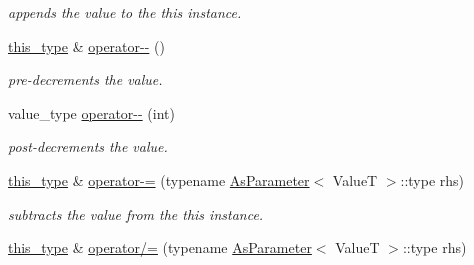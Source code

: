 \begin{DoxyCompactItemize}
\begin{DoxyCompactList}\small\item\em appends the value to the this instance. \end{DoxyCompactList}\item 
\hypertarget{classhryky_1_1atomic_1_1_accessor_a7152a88c74e6e380c901a16f5e16d1b1}{\hyperlink{classhryky_1_1atomic_1_1_accessor_a4957c9dc8163f5fb426f5eb8de5fcd12}{this\-\_\-type} \& \hyperlink{classhryky_1_1atomic_1_1_accessor_a7152a88c74e6e380c901a16f5e16d1b1}{operator-\/-\/} ()}\label{classhryky_1_1atomic_1_1_accessor_a7152a88c74e6e380c901a16f5e16d1b1}

\begin{DoxyCompactList}\small\item\em pre-\/decrements the value. \end{DoxyCompactList}\item 
\hypertarget{classhryky_1_1atomic_1_1_accessor_aace3ec6d3c7a1a5ef95fa0c3780b1f26}{value\-\_\-type \hyperlink{classhryky_1_1atomic_1_1_accessor_aace3ec6d3c7a1a5ef95fa0c3780b1f26}{operator-\/-\/} (int)}\label{classhryky_1_1atomic_1_1_accessor_aace3ec6d3c7a1a5ef95fa0c3780b1f26}

\begin{DoxyCompactList}\small\item\em post-\/decrements the value. \end{DoxyCompactList}\item 
\hypertarget{classhryky_1_1atomic_1_1_accessor_a277dbb78fb920fae22335e5b89cd4e4f}{\hyperlink{classhryky_1_1atomic_1_1_accessor_a4957c9dc8163f5fb426f5eb8de5fcd12}{this\-\_\-type} \& \hyperlink{classhryky_1_1atomic_1_1_accessor_a277dbb78fb920fae22335e5b89cd4e4f}{operator-\/=} (typename \hyperlink{classhryky_1_1_as_parameter}{As\-Parameter}$<$ Value\-T $>$\-::type rhs)}\label{classhryky_1_1atomic_1_1_accessor_a277dbb78fb920fae22335e5b89cd4e4f}

\begin{DoxyCompactList}\small\item\em subtracts the value from the this instance. \end{DoxyCompactList}\item 
\hypertarget{classhryky_1_1atomic_1_1_accessor_a7bf3c085303cd2fb95a53fbed4c11ce8}{\hyperlink{classhryky_1_1atomic_1_1_accessor_a4957c9dc8163f5fb426f5eb8de5fcd12}{this\-\_\-type} \& \hyperlink{classhryky_1_1atomic_1_1_accessor_a7bf3c085303cd2fb95a53fbed4c11ce8}{operator/=} (typename \hyperlink{classhryky_1_1_as_parameter}{As\-Parameter}$<$ Value\-T $>$\-::type rhs)}\label{classhryky_1_1atomic_1_1_accessor_a7bf3c085303cd2fb95a53fbed4c11ce8}


\end{DoxyCompactItemize}
